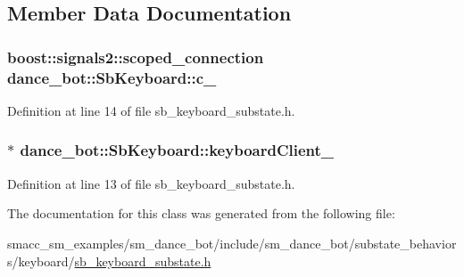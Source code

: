 \subsection{Member Data Documentation}
\subsubsection[{\texorpdfstring{c\+\_\+}{c_}}]{\setlength{\rightskip}{0pt plus 5cm}boost\+::signals2\+::scoped\+\_\+connection dance\+\_\+bot\+::\+Sb\+Keyboard\+::c\+\_\+}\hypertarget{classdance__bot_1_1SbKeyboard_a2aba1d79ed731af4fefe01d08f639dd4}{}\label{classdance__bot_1_1SbKeyboard_a2aba1d79ed731af4fefe01d08f639dd4}


Definition at line 14 of file sb\+\_\+keyboard\+\_\+substate.\+h.

\subsubsection[{\texorpdfstring{keyboard\+Client\+\_\+}{keyboardClient_}}]{$\ast$ dance\+\_\+bot\+::\+Sb\+Keyboard\+::keyboard\+Client\+\_\+}\hypertarget{classdance__bot_1_1SbKeyboard_a647842945b284cb2013a3bbcbaf38315}{}\label{classdance__bot_1_1SbKeyboard_a647842945b284cb2013a3bbcbaf38315}


Definition at line 13 of file sb\+\_\+keyboard\+\_\+substate.\+h.



The documentation for this class was generated from the following file\+:\begin{DoxyCompactItemize}
\item 
smacc\+\_\+sm\+\_\+examples/sm\+\_\+dance\+\_\+bot/include/sm\+\_\+dance\+\_\+bot/substate\+\_\+behaviors/keyboard/\hyperlink{sb__keyboard__substate_8h}{sb\+\_\+keyboard\+\_\+substate.\+h}\end{DoxyCompactItemize}
